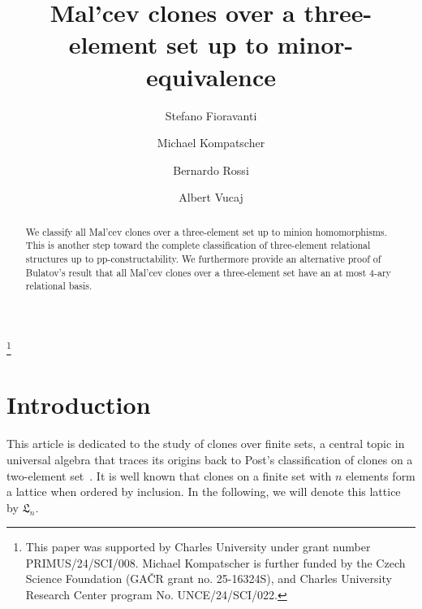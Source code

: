 \documentclass[12pt]{amsart}
\theoremstyle{definition}
\theoremstyle{definition}
\begin{document}
\title{Mal'cev clones over a three-element set up to minor-equivalence}


\author[S.~Fioravanti]{Stefano Fioravanti}
\address{Department of Algebra\\ Charles University\\Prague\\ Czechia
}

\author[M.~Kompatscher]{Michael Kompatscher}
\address{Department of Algebra\\ Charles University\\Prague\\ Czechia}

\author[B.~Rossi]{Bernardo Rossi}
\address{Siena, Italy}

\author[A.~Vucaj]{Albert Vucaj}
\address{Poggibonsi, Italy}

\thanks{This paper was supported by Charles University under grant number PRIMUS/24/SCI/008. Michael Kompatscher is further funded by the Czech Science Foundation
(GA\v{C}R grant no. 25-16324S), and Charles University Research Center program No. UNCE/24/SCI/022.}

\begin{abstract}
    We classify all Mal'cev clones over a three-element set up to minion homomorphisms. This is another step toward the complete classification of three-element relational structures up to pp-constructability.
    We furthermore provide an alternative proof of Bulatov's result that all Mal'cev clones over a three-element set have an at most 4-ary relational basis.
\end{abstract}




\maketitle


\section{Introduction}\label{sec:Intro}
This article is dedicated to the study of clones over finite sets, a central topic in universal algebra that traces its origins back to Post’s classification of clones on a two-element set~\cite{Post}. It is well known that clones on a finite set with $n$ elements form a lattice when ordered by inclusion. In the following, we will denote this lattice by $\mathfrak{L}_n$. 
\end{document}

